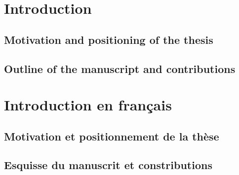 

\chapter{Introduction}




\section{Motivation and positioning of the thesis}


\section{Outline of the manuscript and contributions}



\chapter{Introduction en français}

\section{Motivation et positionnement de la thèse}

\section{Esquisse du manuscrit et constributions}